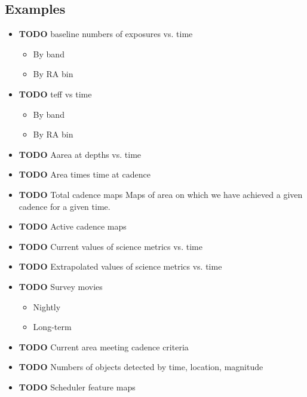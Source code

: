\subsection{Examples}
\label{sec:org43e879a}
\begin{itemize}
\item {\bfseries\sffamily TODO} baseline numbers of exposures vs. time
\label{sec:orgb2ec139}
\begin{itemize}
\item By band
\label{sec:org34e2d8e}
\item By RA bin
\label{sec:orgf3f6af8}
\end{itemize}
\item {\bfseries\sffamily TODO} teff vs time
\label{sec:orgdcbbc25}
\begin{itemize}
\item By band
\label{sec:org7cdb5e2}
\item By RA bin
\label{sec:org5da8eb4}
\end{itemize}
\item {\bfseries\sffamily TODO} Aarea at depths vs. time
\label{sec:org25c0070}
\item {\bfseries\sffamily TODO} Area times time at cadence
\label{sec:org9ef21ac}
\item {\bfseries\sffamily TODO} Total cadence maps
\label{sec:org97a3d64}
Maps of area on which we have achieved a given cadence for a given time.
\item {\bfseries\sffamily TODO} Active cadence maps
\label{sec:org812f816}
\item {\bfseries\sffamily TODO} Current values of science metrics vs. time
\label{sec:org2330031}
\item {\bfseries\sffamily TODO} Extrapolated values of science metrics vs. time
\label{sec:org8ff3534}
\item {\bfseries\sffamily TODO} Survey movies
\label{sec:org832691e}
\begin{itemize}
\item Nightly
\label{sec:orgbafb595}
\item Long-term
\label{sec:org6c2cb95}
\end{itemize}
\item {\bfseries\sffamily TODO} Current area meeting cadence criteria
\label{sec:org17ec571}
\item {\bfseries\sffamily TODO} Numbers of objects detected by time, location, magnitude
\label{sec:org63f0d26}
\item {\bfseries\sffamily TODO} Scheduler feature maps

\end{itemize}
